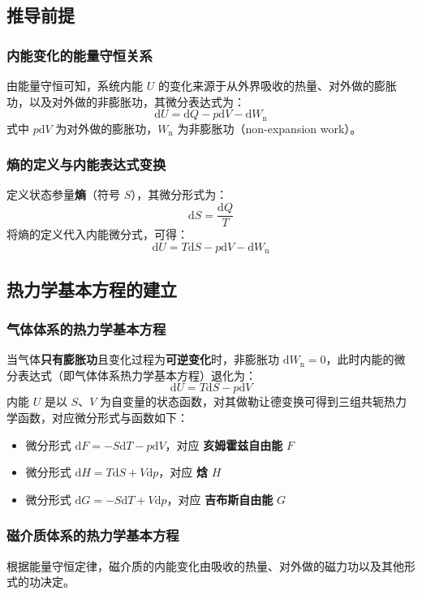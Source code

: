 \documentclass{article}
\begin{document}
	\subsection{推导前提}
	
	\subsubsection{内能变化的能量守恒关系}
	由能量守恒可知，系统内能 $U$ 的变化来源于从外界吸收的热量、对外做的膨胀功，以及对外做的非膨胀功，其微分表达式为：
	\[
	\mathrm{d}U=\mathrm{d}Q-p\mathrm{d}V-\mathrm{d}W_\mathrm{n}
	\]
	式中 $p\mathrm{d}V$ 为对外做的膨胀功，$W_\mathrm{n}$ 为非膨胀功（non-expansion work）。
	
	\subsubsection{熵的定义与内能表达式变换}
	定义状态参量\textbf{熵}（符号 $S$），其微分形式为：
	\[
	\mathrm{d}S=\frac{\mathrm{d}Q}{T}
	\]
	将熵的定义代入内能微分式，可得：
	\[
	\mathrm{d}U=T\mathrm{d}S-p\mathrm{d}V-\mathrm{d}W_\mathrm{n}
	\]
	
	\subsection{热力学基本方程的建立}
	
	\subsubsection{气体体系的热力学基本方程}
	当气体\textbf{只有膨胀功}且变化过程为\textbf{可逆变化}时，非膨胀功 $\mathrm{d}W_\mathrm{n}=0$，此时内能的微分表达式（即气体体系热力学基本方程）退化为：
	\[
	\mathrm{d}U=T\mathrm{d}S-p\mathrm{d}V
	\]
	内能 $U$ 是以 $S、V$ 为自变量的状态函数，对其做勒让德变换可得到三组共轭热力学函数，对应微分形式与函数如下：
	\begin{itemize}[leftmargin=2em]
		\item 微分形式 $\mathrm{d}F=-S\mathrm{d}T-p\mathrm{d}V$，对应 \textbf{亥姆霍兹自由能} $F$
		\item 微分形式 $\mathrm{d}H=T\mathrm{d}S+V\mathrm{d}p$，对应 \textbf{焓} $H$
		\item 微分形式 $\mathrm{d}G=-S\mathrm{d}T+V\mathrm{d}p$，对应 \textbf{吉布斯自由能} $G$
	\end{itemize}
	
	\subsubsection{磁介质体系的热力学基本方程}
	根据能量守恒定律，磁介质的内能变化由吸收的热量、对外做的磁力功以及其他形式的功决定。
	
\end{document}
